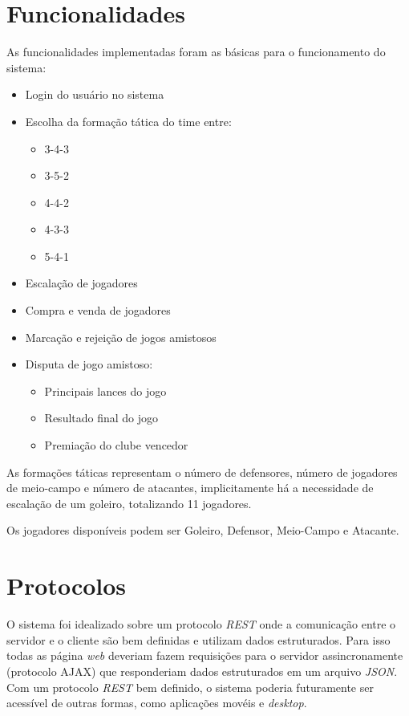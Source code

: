 \documentclass[11pt,a4paper]{article}
\begin{document}
	\section*{Funcionalidades}
    	As funcionalidades implementadas foram as básicas para o funcionamento do sistema:
        \begin{itemize}
        	\item Login do usuário no sistema
            \item Escolha da formação tática do time entre:
            	\begin{itemize}
                	\item 3-4-3
                    \item 3-5-2
                    \item 4-4-2
                    \item 4-3-3
                    \item 5-4-1
                \end{itemize}
           \item Escalação de jogadores
           \item Compra e venda de jogadores
           \item Marcação e rejeição de jogos amistosos
           \item Disputa de jogo amistoso:
           		\begin{itemize}
                	\item Principais lances do jogo
                    \item Resultado final do jogo
                    \item Premiação do clube vencedor
                \end{itemize}
        \end{itemize}
        As formações táticas representam o número de defensores, número de jogadores de meio-campo e número de atacantes, implicitamente há a necessidade de escalação de um goleiro, totalizando 11 jogadores.
        
        Os jogadores disponíveis podem ser Goleiro, Defensor, Meio-Campo e Atacante.
        
	\section*{Protocolos}
    	O sistema foi idealizado sobre um protocolo \textit{REST} onde a comunicação entre o servidor e o cliente são bem definidas e utilizam dados estruturados. Para isso todas as página \textit{web} deveriam fazem requisições para o servidor assincronamente (protocolo AJAX) que responderiam dados estruturados em um arquivo \textit{JSON}. Com um protocolo \textit{REST} bem definido, o sistema poderia futuramente ser acessível de outras formas, como aplicações movéis e \textit{desktop}.
        
\end{document}
